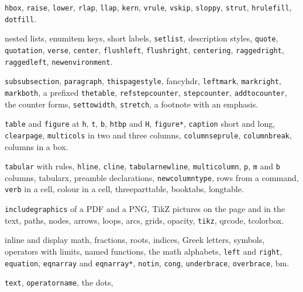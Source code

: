\documentclass{article}
\numberwithin{equation}{section}
\theoremstyle{definition}
\theoremstyle{remark}
\begin{document}
\begin{description}
        \texttt{hbox}, \texttt{raise}, \texttt{lower}, \texttt{rlap}, \texttt{llap},
        \texttt{kern}, \texttt{vrule}, \texttt{vskip}, \texttt{sloppy}, \texttt{strut},
        \texttt{hrulefill}, \texttt{dotfill}.
  \item[Section~\ref{sec:lists}] nested lists, enumitem keys, short labels,
        \texttt{setlist}, description styles, \texttt{quote}, \texttt{quotation},
        \texttt{verse}, \texttt{center}, \texttt{flushleft}, \texttt{flushright},
        \texttt{centering}, \texttt{raggedright}, \texttt{raggedleft},
        \texttt{newenvironment}.
  \item[Section~\ref{sec:refs-chapter}] \texttt{subsubsection}, \texttt{paragraph},
        \texttt{thispagestyle}, fancyhdr, \texttt{leftmark}, \texttt{markright},
        \texttt{markboth}, a prefixed \texttt{thetable}, \texttt{refstepcounter},
        \texttt{stepcounter}, \texttt{addtocounter}, the counter forms,
        \texttt{settowidth}, \texttt{stretch}, a footnote with an emphasis.
  \item[Section~\ref{sec:floats}] \texttt{table} and \texttt{figure} at \texttt{h},
        \texttt{t}, \texttt{b}, \texttt{htbp} and \texttt{H}, \texttt{figure*},
        \texttt{caption} short and long, \texttt{clearpage}, \texttt{multicols} in two
        and three columns, \texttt{columnseprule}, \texttt{columnbreak}, columns in a
        box.
  \item[Section~\ref{sec:tables}] \texttt{tabular} with rules, \texttt{hline},
        \texttt{cline}, \texttt{tabularnewline}, \texttt{multicolumn}, \texttt{p},
        \texttt{m} and \texttt{b} columns, tabularx, preamble declarations,
        \texttt{newcolumntype}, rows from a command, \texttt{verb} in a cell, colour in
        a cell, threeparttable, booktabs, longtable.
  \item[Section~\ref{sec:graphics}] \texttt{includegraphics} of a PDF and a PNG, TikZ
        pictures on the page and in the text, paths, nodes, arrows, loops, arcs, grids,
        opacity, \texttt{tikz}, qrcode, tcolorbox.
  \item[Section~\ref{sec:math}] inline and display math, fractions, roots, indices,
        Greek letters, symbols, operators with limits, named functions, the math
        alphabets, \texttt{left} and \texttt{right}, \texttt{equation},
        \texttt{eqnarray} and \texttt{eqnarray*}, \texttt{notin}, \texttt{cong},
        \texttt{underbrace}, \texttt{overbrace}, bm.
  \item[Section~\ref{sec:amsmath}] \texttt{text}, \texttt{operatorname}, the dots,

\end{description}
\end{document}
